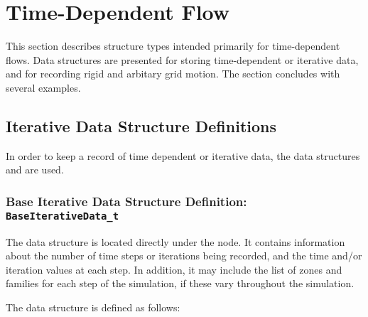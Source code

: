 \section{Time-Dependent Flow}
\label{s:timedep}
\thispagestyle{plain}

This section describes structure types intended primarily for time-dependent
flows.
Data structures are presented for storing time-dependent or iterative
data, and for recording rigid and arbitary grid motion.
The section concludes with several examples.

\subsection{Iterative Data Structure Definitions}
\label{s:IterativeData}

In order to keep a record of time dependent or iterative data, the data
structures  and 
are used.

\subsubsection{Base Iterative Data Structure Definition: \texttt{BaseIterativeData\_t}}
\label{s:BaseIterativeData}

The  data structure is located directly under
the  node.
It contains information about the number of time steps or iterations
being recorded, and the time and/or iteration values at each step.
In addition, it may include the list of zones and families for each step
of the simulation, if these vary throughout the simulation.

The  data structure is defined as follows:


